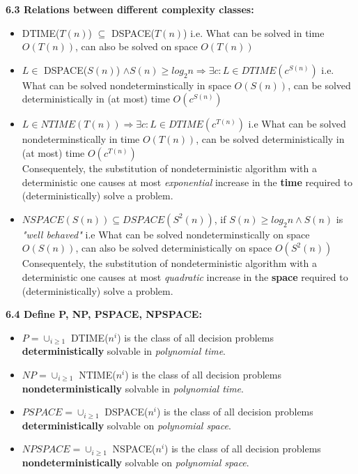 \documentclass{article}
\begin{document}
\begin{multicols}{2}
\textbf{6.3 Relations between different complexity classes:}
\begin{itemize}
    \setlength\itemsep{-0.4em}
    \item DTIME($T(n)$) $\subseteq$ DSPACE($T(n)$) \small{i.e. What can be solved in time $O(T(n))$, can also be solved on space $O(T(n))$}
    \item $L \in$ DSPACE($S(n)$) $\wedge S(n) \geq log_2 n \Rightarrow \exists c: L \in DTIME(c^{S(n)})$ \small{i.e. What can be solved nondeterminstically in space $O(S(n))$, can be solved deterministically in (at most) time $O(c^{S(n)})$}
    \item $L \in NTIME (T(n)) \Rightarrow \exists c: L \in DTIME(c^{T(n)})$ \small{i.e What can be solved nondeterminstically in time $O(T(n))$, can be solved deterministically in (at most) time $O(c^{T(n)})$}\\
        Consequentely, the substitution of nondeterministic algorithm with a deterministic one causes at most \textit{exponential} increase in the \textbf{time} required to (deterministically) solve a problem.
    \item $NSPACE(S(n)) \subseteq DSPACE(S^2(n))$, if $S(n) \geq log_2 n \wedge S(n)$ is \textit{"well behaved"} \small{i.e What can be solved nondeterminstically on space $O(S(n))$, can also be solved deterministically on space $O(S^2(n))$} \\
    Consequentely, the substitution of nondeterministic algorithm with a deterministic one causes at most \textit{quadratic} increase in the \textbf{space} required to (deterministically) solve a problem.
\end{itemize}

\textbf{6.4 Define P, NP, PSPACE, NPSPACE:}
\begin{itemize}
    \setlength\itemsep{-0.4em}
    \item $P = \cup_{i \geq 1}$ DTIME($n^i$) is the class of all decision problems \textbf{deterministically} solvable in \textit{polynomial time}.
    \item $NP = \cup_{i \geq 1}$ NTIME($n^i$) is the class of all decision problems \textbf{nondeterministically} solvable in \textit{polynomial time}.
    \item $PSPACE = \cup_{i \geq 1}$ DSPACE($n^i$) is the class of all decision problems \textbf{deterministically} solvable on \textit{polynomial space}.
    \item $NPSPACE= \cup_{i \geq 1}$ NSPACE($n^i$) is the class of all decision problems \textbf{nondeterministically} solvable on \textit{polynomial space}.
\end{itemize}


\end{multicols}
\end{document}
